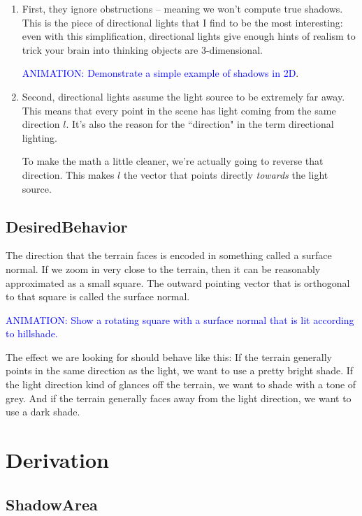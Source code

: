 \documentclass{article}
\newcommand\animation[1]{\textcolor{blue}{ANIMATION: #1}}
\begin{document}
\begin{enumerate}

\item First, they ignore obstructions -- meaning we won't compute true shadows.
This is the piece of directional lights that I find to be the most interesting: even with this simplification, directional lights give enough hints of realism to trick your brain into thinking objects are 3-dimensional.

\animation{Demonstrate a simple example of shadows in 2D}.
	
\item Second, directional lights assume the light source to be extremely far away.
This means that every point in the scene has light coming from the same direction $l$.
It's also the reason for the ``direction" in the term directional lighting.

To make the math a little cleaner, we're actually going to reverse that direction.
This makes $l$ the vector that points directly \textit{towards} the light source.

\end{enumerate}

\subsection{DesiredBehavior}

The direction that the terrain faces is encoded in something called a surface normal.
If we zoom in very close to the terrain, then it can be reasonably approximated as a small square.
The outward pointing vector that is orthogonal to that square is called the surface normal.

\animation{Show a rotating square with a surface normal that is lit according to hillshade.}

The effect we are looking for should behave like this:
If the terrain generally points in the same direction as the light, we want to use a pretty bright shade.
If the light direction kind of glances off the terrain, we want to shade with a tone of grey.
And if the terrain generally faces away from the light direction, we want to use a dark shade.

\section{Derivation}

\subsection{ShadowArea}
\end{document}
